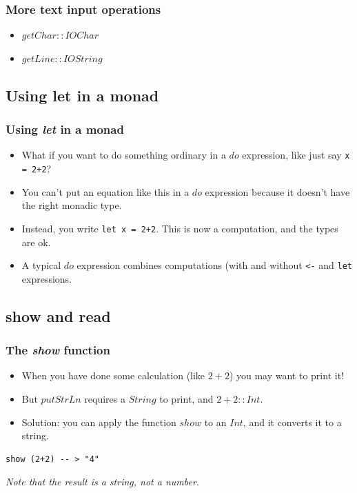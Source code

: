 \documentclass{beamer}
\begin{document}
\begin{frame}[fragile]
\frametitle{More text input operations}

\begin{itemize}
\item $getChar :: IO Char$
\item $getLine :: IO String$
\end{itemize}

\end{frame}


\subsection{Using let in a monad}
\begin{frame}
\frametitle{Using \emph{let} in a monad}

\begin{itemize}
\item What if you want to do something ordinary in a $do$
  expression, like just say {\tt x = 2+2}?
\item You can't put an equation like this in a $do$ expression
  because it doesn't have the right monadic type.
\item Instead, you write {\tt let x = 2+2}.  This is now a computation,
  and the types are ok.
\item A typical $do$ expression combines computations (with and
  without {\tt <-} and {\tt let} expressions.
\end{itemize}

\end{frame}


\subsection{show and read}

\begin{frame}[fragile]
\frametitle{The \emph{show} function}

\begin{itemize}
\item When you have done some calculation (like $2+2$) you may want
  to print it!
\item But $putStrLn$ requires a $String$ to print, and $2+2 :: Int$.
\item Solution: you can apply the function $show$ to an $Int$, and
  it converts it to a string.
\end{itemize}

\begin{verbatim}
show (2+2) -- > "4"
\end{verbatim}

\emph{Note that the result is a string, not a number.}

\end{frame}
\end{document}
